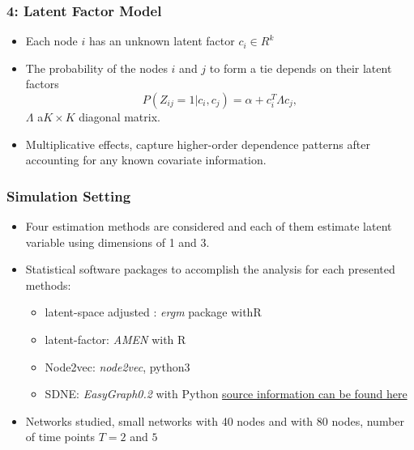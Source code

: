 \documentclass{beamer}
\begin{document}
\begin{frame}
\frametitle{4: Latent Factor Model}
\begin{itemize}
\item Each node $i$ has an unknown latent factor $c_{i}\in R^{k}$
\vspace{10pt}
\item The probability of the nodes $i$  and $j$ to form a tie depends on their latent factors
 \[P(Z_{ij}=1|c_{i},c_{j})=\alpha+ c_{i}^{T} \Lambda c_{j}
    \label{3},\]  $\Lambda$ a$ K\times K$ diagonal matrix.
\vspace{10pt}
\item  Multiplicative effects, capture higher-order dependence patterns  after accounting for any known covariate information.

\end{itemize}
\end{frame}
\begin{frame}
\frametitle{Simulation Setting}
\begin{itemize}
\item Four estimation methods are considered  and each of them estimate latent variable using  dimensions of 1 and 3.
\vspace{10pt}
\item Statistical software packages to accomplish the analysis for each presented methods:
\begin{itemize}
\item  latent-space adjusted : \textit{ergm} package withR  \textit{\cite{your-key-here}}
\vspace{5pt}
\item latent-factor: \textit{AMEN} with R  \textit{\cite{https://doi.org/10.48550/arxiv.1506.08237}}
\vspace{5pt}
\item Node2vec: \textit{node2vec}, python3 \textit{\cite{DBLP:journals/corr/GroverL16}}
\vspace{5pt}
\item SDNE: \textit{EasyGraph0.2} with Python 
\href{https://easygraph.github.io/docs/reference/graph_embedding.html}{source information can  be found here}
\end{itemize}

\vspace{10pt}
\item{Networks studied, small networks with 40 nodes and  with 80 nodes, number of time points  $T=2$ and $5$}
\end{itemize}
\end{frame}
\end{document}
